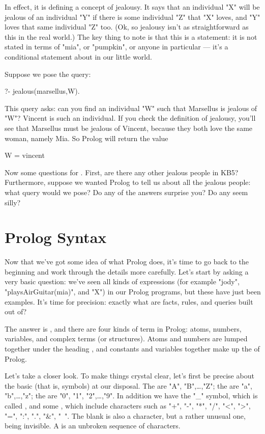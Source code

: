 In effect, it is defining a concept of jealousy.  It says that an
individual "X" will be jealous of an individual "Y" if there is some
individual "Z" that "X" loves, and "Y" loves that same individual "Z"
too. (Ok, so jealousy isn't as straightforward as this in the real
world.) The key thing to note is that this is a 
statement: it is not stated in terms of "mia", or "pumpkin", or anyone
in particular --- it's a conditional statement about
 in our little world.

Suppose we pose the query:
%
\begin{LPNcodedisplay}
?- jealous(marsellus,W).
\end{LPNcodedisplay}
%
This query asks: can you find an individual "W" such that Marsellus is
jealous of "W"?  Vincent is such an individual.  If you check the
definition of jealousy, you'll see that Marsellus must be jealous of
Vincent, because they both love the same woman, namely Mia. So Prolog
will return the value
%
\begin{LPNcodedisplay}
W = vincent
\end{LPNcodedisplay}


Now some questions for . First, are there any other
jealous people in KB5? Furthermore, suppose we wanted Prolog to tell
us about all the jealous people: what query would we pose? Do any of
the answers surprise you? Do any seem silly?



\section{Prolog Syntax}\label{SEC.L1.SYNTAX}

Now that we've got some idea of what Prolog does, it's time to go back
to the beginning and work through the details more carefully. Let's
start by asking a very basic question: we've seen all kinds of
expressions (for example "jody", "playsAirGuitar(mia)", and "X") in
our Prolog programs, but these have just been examples.  It's time for
precision: exactly what are facts, rules, and queries built out of?

The answer is , and there are four kinds of term in
Prolog: atoms, numbers, variables, and complex terms (or structures).
Atoms and numbers are lumped together under the heading
, and constants and variables together make up the
 of Prolog.

Let's take a closer look. To make things crystal clear, let's first be
precise about the basic  (that is, symbols) at our
disposal.  The  are "A", "B",\ldots,"Z";
the  are "a", "b",\ldots,"z"; the
 are "0", "1", "2",\ldots,"9". In addition we have the "_"
symbol, which is called , and some , which include characters such as "+", "-", "*", "/",
"<", ">", "=", ":", ".", "\&", "~".  The blank  is also
a character, but a rather unusual one, being invisible. A
 is an unbroken sequence of characters.



